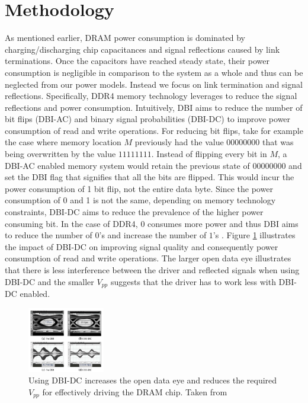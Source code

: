 \section{Methodology}
\label{sec-methodology}


As mentioned earlier, DRAM power consumption is dominated by
charging/discharging chip capacitances and signal reflections caused by link
terminations. Once the capacitors have reached steady state, their power
consumption is negligible in comparison to the system as a whole and thus can
be neglected from our power models. Instead we focus on link termination and
signal reflections. Specifically, DDR4 memory technology leverages  to
reduce the signal reflections and power consumption. Intuitively, DBI aims to
reduce the number of bit flips (DBI-AC) and binary signal probabilities
(DBI-DC) to improve power consumption of read and write operations. For
reducing bit flips, take for example the case where memory location $M$
previously had the value $00000000$ that was being overwritten by the value
$11111111$. Instead of flipping every bit in $M$, a DBI-AC enabled memory system
would retain the previous state of $00000000$ and set the DBI flag that
signifies that all the bits are flipped.  This would incur the power consumption
of 1 bit flip, not the entire data byte.  Since the power consumption of 0 and
1 is not the same, depending on memory technology constraints, DBI-DC aims to
reduce the prevalence of the higher power consuming bit. In the case of DDR4,
$0$ consumes more power and thus DBI aims to reduce the number of $0$'s and
increase the number of $1$'s . Figure \ref{fig:dbi-dc}
illustrates the impact of DBI-DC on improving signal quality and consequently
power consumption of read and write operations. The larger open data eye
illustrates that there is less interference between the driver and reflected
signals when using DBI-DC and the smaller $V_{pp}$ suggests that the driver has
to work less with DBI-DC enabled.

\begin{figure}[!htb]
  \centering
  \includegraphics[width=0.3\textwidth]{figs/dbi-dc}
  \caption{Using DBI-DC increases the open data eye and reduces the required
  $V_{pp}$ for effectively driving the DRAM chip. Taken from \cite{hollis}}
  \label{fig:dbi-dc}
\end{figure}

